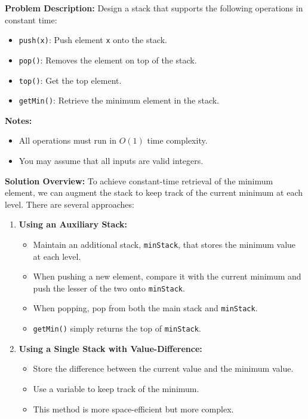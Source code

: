 

\textbf{Problem Description:}  
Design a stack that supports the following operations in constant time:

\begin{itemize}
    \item \texttt{push(x)}: Push element \texttt{x} onto the stack.
    \item \texttt{pop()}: Removes the element on top of the stack.
    \item \texttt{top()}: Get the top element.
    \item \texttt{getMin()}: Retrieve the minimum element in the stack.
\end{itemize}

\textbf{Notes:}
\begin{itemize}
    \item All operations must run in \(O(1)\) time complexity.
    \item You may assume that all inputs are valid integers.
\end{itemize}


\textbf{Solution Overview:}  
To achieve constant-time retrieval of the minimum element, we can augment the stack to keep track of the current minimum at each level. There are several approaches:

\begin{enumerate}
    \item \textbf{Using an Auxiliary Stack:}
        \begin{itemize}
            \item Maintain an additional stack, \texttt{minStack}, that stores the minimum value at each level.
            \item When pushing a new element, compare it with the current minimum and push the lesser of the two onto \texttt{minStack}.
            \item When popping, pop from both the main stack and \texttt{minStack}.
            \item \texttt{getMin()} simply returns the top of \texttt{minStack}.
        \end{itemize}
    \item \textbf{Using a Single Stack with Value-Difference:}
        \begin{itemize}
            \item Store the difference between the current value and the minimum value.
            \item Use a variable to keep track of the minimum.
            \item This method is more space-efficient but more complex.
        \end{itemize}
\end{enumerate}

